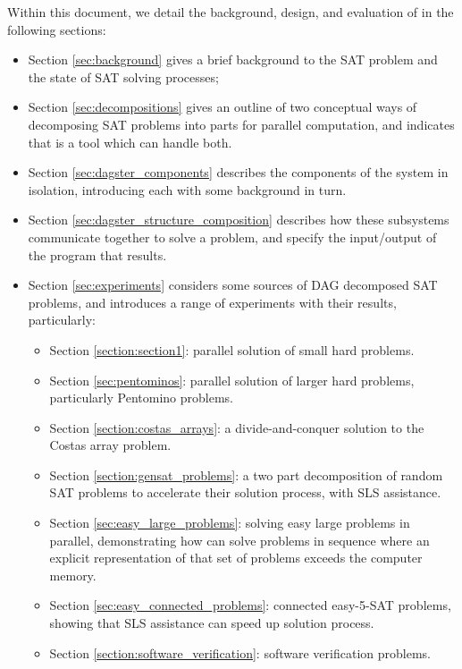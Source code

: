 \documentclass[
10pt, %
a4paper, %
oneside, %
headinclude,footinclude, %
BCOR5mm, %
]{scrartcl}
\begin{document}
Within this document, we detail the background, design, and evaluation of \dagster in the following sections:
\begin{itemize}
\item	Section \ref{sec:background} gives a brief background to the SAT problem and the state of SAT solving processes;
\item	Section \ref{sec:decompositions} gives an outline of two conceptual ways of decomposing SAT problems into parts for parallel computation, and indicates that \dagster is a tool which can handle both.
\item	Section \ref{sec:dagster_components} describes the components of the \dagster system in isolation, introducing each with some background in turn.
\item	Section \ref{sec:dagster_structure_composition} describes how these subsystems communicate together to solve a problem, and specify the input/output of the \dagster program that results.
\item	Section \ref{sec:experiments} considers some sources of DAG decomposed SAT problems, and introduces a range of \dagster experiments with their results, particularly: 
\begin{itemize}
\item	Section \ref{section:section1}: parallel solution of small hard problems.
\item	Section \ref{sec:pentominos}: parallel solution of larger hard problems, particularly Pentomino problems.
\item	Section \ref{section:costas_arrays}: a divide-and-conquer solution to the Costas array problem.
\item	Section \ref{section:gensat_problems}: a two part decomposition of random SAT problems to accelerate their solution process, with SLS assistance.
\item	Section \ref{sec:easy_large_problems}: solving easy large problems in parallel, demonstrating how \dagster can solve problems in sequence where an explicit representation of that set of problems exceeds the computer memory.
\item	Section \ref{sec:easy_connected_problems}: connected easy-5-SAT problems, showing that SLS assistance can speed up solution process.
\item	Section \ref{section:software_verification}: software verification problems.
\end{itemize}
\end{itemize}
\end{document}
